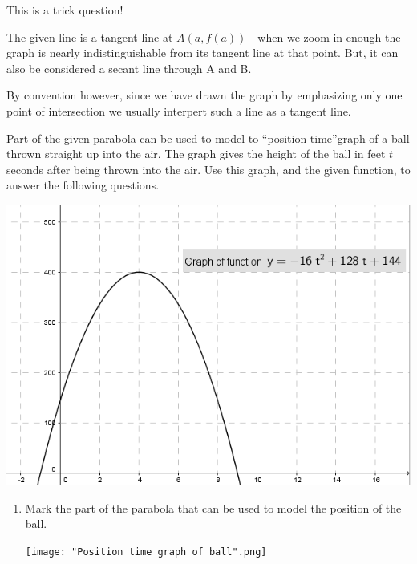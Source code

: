 \documentclass[nooutcomes]{ximera}
\begin{document}
\begin{problem}
\begin{enumerate}
	\begin{freeResponse}
	This is a trick question!

        The given line is a tangent line at  $A(a,f(a))$---when we zoom in enough the graph is nearly indistinguishable from its tangent line at that point.
        But, it can also be considered a secant line through A and B.

        By convention however, since we have drawn the graph by emphasizing only one point of intersection we usually interpert such a line as a tangent line.
	      \end{freeResponse}
	\end{enumerate}

\end{problem}

\begin{problem}
 Part of the given parabola can be used to model to ``position-time''graph of a ball thrown straight up into the air.  The graph gives the height of the ball in feet $t$ seconds after being thrown into the air.
  Use this graph, and the given function, to answer the following questions.
  \begin{image}
    \includegraphics[scale = 0.8]{figure2.png}
  \end{image}
	
	
		\begin{enumerate}
		\item Mark the part of the parabola that can be used to model the position of the ball.		
		\begin{freeResponse} \hfil
       		 \begin{center}
       	  	 \texttt{[image: "Position time graph of ball".png]}
        		\end{center}
		\end{freeResponse}		


\end{enumerate}
\end{problem}
\end{document}
